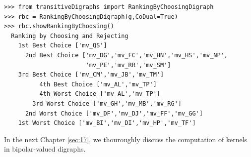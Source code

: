 \begin{lstlisting}[caption={Bipolar ranking-by-choosing the Grafitti movies},label=list:16.9]
>>> from transitiveDigraphs import RankingByChoosingDigraph
>>> rbc = RankingByChoosingDigraph(g,CoDual=True)
>>> rbc.showRankingByChoosing()
  Ranking by Choosing and Rejecting
    1st Best Choice ['mv_QS']
      2nd Best Choice ['mv_DG','mv_FC','mv_HN','mv_HS','mv_NP',
                       'mv_PE','mv_RR','mv_SM']
	3rd Best Choice ['mv_CM','mv_JB','mv_TM']
          4th Best Choice ['mv_AL','mv_TP']
          4th Worst Choice ['mv_AL','mv_TP']
        3rd Worst Choice ['mv_GH','mv_MB','mv_RG']
      2nd Worst Choice ['mv_DF','mv_DJ','mv_FF','mv_GG']
    1st Worst Choice ['mv_BI','mv_DI','mv_HP','mv_TF']
\end{lstlisting}

In the next Chapter \ref{sec:17}, we thouroughly discuss the computation of kernels in bipolar-valued digraphs.
